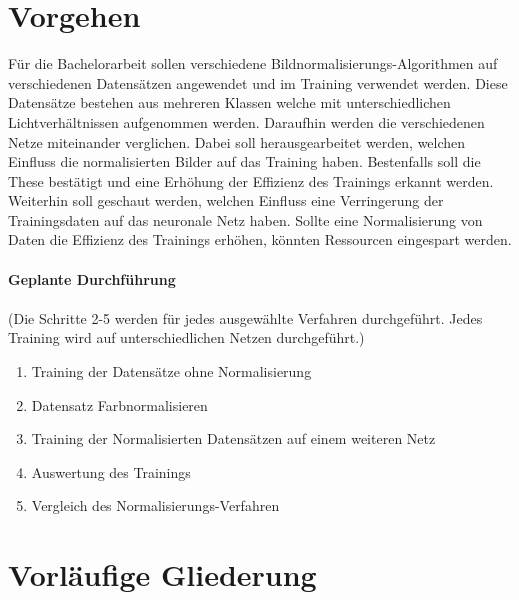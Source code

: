 \documentclass[a4paper,12pt,oneside]{article}
\begin{document}
  \section{Vorgehen}
Für die Bachelorarbeit sollen verschiedene Bildnormalisierungs-Algorithmen auf verschiedenen Datensätzen angewendet und im Training verwendet werden. Diese Datensätze bestehen aus mehreren Klassen welche mit unterschiedlichen Lichtverhältnissen aufgenommen werden. Daraufhin werden die verschiedenen Netze miteinander verglichen. Dabei soll herausgearbeitet werden, welchen Einfluss die normalisierten Bilder auf das Training haben. Bestenfalls soll die These bestätigt und eine Erhöhung der Effizienz des Trainings erkannt werden. Weiterhin soll geschaut werden, welchen Einfluss eine Verringerung der Trainingsdaten auf das neuronale Netz haben. Sollte eine Normalisierung von Daten die Effizienz des Trainings erhöhen, könnten Ressourcen eingespart werden.\\\\
\textbf{Geplante Durchführung}\\\\
(Die Schritte 2-5 werden für jedes ausgewählte Verfahren durchgeführt. Jedes Training wird auf unterschiedlichen Netzen durchgeführt.)
  \begin{enumerate}
\item Training der Datensätze ohne Normalisierung
\item Datensatz Farbnormalisieren
\item Training der Normalisierten Datensätzen auf einem weiteren Netz
\item Auswertung des Trainings
\item Vergleich des Normalisierungs-Verfahren
  \end{enumerate}
  
  \newpage
  
  \section{Vorläufige Gliederung}
  
\end{document}
